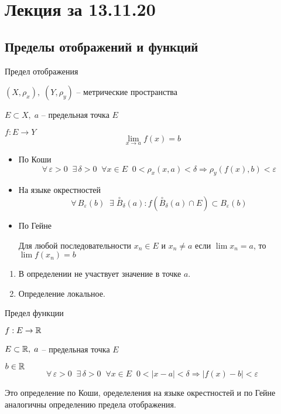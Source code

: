 \section{Лекция за 13.11.20}
\subsection{Пределы отображений и функций}
\begin{conj} 
    Предел отображения 
\end{conj}
$(X, \rho_x), \; (Y, \rho_y)$ -- метрические пространства 

$E \subset X, \; a$ -- предельная точка $E$

$f : E \to Y$
\[ \lim_{x \to a} f(x) = b \]
\begin{itemize}
    \item По Коши
    \[ \forall \, \varepsilon > 0 \;\; \exists \, \delta > 0 \;\; \forall x \in E \;\; 0 < \rho_x(x, a) < \delta \Rightarrow \rho_y(f(x), b) < \varepsilon \]
    \item На языке окрестностей
    \[ \forall \, B_{\varepsilon}(b) \;\; \exists \; \overset{\circ}{B}_{\delta}(a) : f(\overset{\circ}{B}_{\delta}(a) \cap E) \subset B_{\varepsilon}(b) \]
    \item По Гейне
    
    Для любой последовательности $x_n \in E$ и $x_n \neq a$ если $\lim x_n = a$, то $\lim f(x_n) = b$
\end{itemize}

\begin{notice}
    \begin{enumerate}
        \item В определении не участвует значение в точке $a$.
        \item Определение локальное.
    \end{enumerate}
\end{notice}

\begin{conj} 
    Предел функции 
\end{conj}
$f : E \to \mathbb{R}$

$E \subset \mathbb{R}, \; a$ -- предельная точка $E$

$b \in \mathbb{R}$
\[ \forall \, \varepsilon > 0 \;\; \exists \, \delta > 0 \;\; \forall x \in E \;\; 0 < |x - a| < \delta \Rightarrow |f(x) - b| < \varepsilon \]
\begin{notice}
    Это определение по Коши, оределеления на языке окрестностей и по Гейне аналогичны определению предела отображения.
\end{notice}


